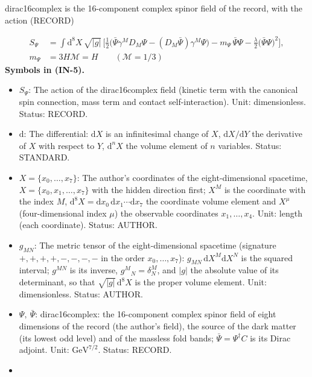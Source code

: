 \documentclass[
  10pt,
]{article}
\providecommand{\tightlist}{%
  \setlength{\itemsep}{0pt}\setlength{\parskip}{0pt}}
\begin{document}
dirac16complex is the 16-component complex spinor field of the record,
with the action (RECORD)

\[
\begin{aligned}
S_\Psi &= \int\mathrm{d}^8X\,\sqrt{\lvert g\rvert}\,\Big[\tfrac12\big(\bar\Psi\gamma^MD_M\Psi
 - (D_M\bar\Psi)\gamma^M\Psi\big) - m_\Psi\,\bar\Psi\Psi - \frac{\lambda}{2}\big(\bar\Psi\Psi\big)^2\Big],\\
m_\Psi &= 3H\mathcal{M} = H\qquad (\mathcal{M} = 1/3)
\end{aligned} \tag{IN-5}
\] \textbf{Symbols in (IN-5).}

\begin{itemize}
\tightlist
\item
  \(S_\Psi\): The action of the dirac16complex field (kinetic term with
  the canonical spin connection, mass term and contact
  self-interaction). Unit: dimensionless. Status: RECORD.
\item
  \(\mathrm{d}\): The differential: \(\mathrm{d}X\) is an infinitesimal
  change of \(X\), \(\mathrm{d}X/\mathrm{d}Y\) the derivative of \(X\)
  with respect to \(Y\), \(\mathrm{d}^nX\) the volume element of \(n\)
  variables. Status: STANDARD.
\item
  \(X = \{x_0, \dots, x_7\}\): The author's coordinates of the
  eight-dimensional spacetime, \(X = \{x_0, x_1, \dots, x_7\}\) with the
  hidden direction first; \(X^M\) is the coordinate with the index
  \(M\),
  \(\mathrm{d}^8X = \mathrm{d}x_0\,\mathrm{d}x_1\cdots\mathrm{d}x_7\)
  the coordinate volume element and \(X^\mu\) (four-dimensional index
  \(\mu\)) the observable coordinates \(x_1, \dots, x_4\). Unit: length
  (each coordinate). Status: AUTHOR.
\item
  \(g_{MN}\): The metric tensor of the eight-dimensional spacetime
  (signature \(+,+,+,+,-,-,-,-\) in the order \(x_0, \dots, x_7\)):
  \(g_{MN}\,\mathrm{d}X^M\mathrm{d}X^N\) is the squared interval;
  \(g^{MN}\) is its inverse, \(g^M{}_N = \delta^M_N\), and
  \(\lvert g\rvert\) the absolute value of its determinant, so that
  \(\sqrt{\lvert g\rvert}\,\mathrm{d}^8X\) is the proper volume element.
  Unit: dimensionless. Status: AUTHOR.
\item
  \(\Psi,\ \bar\Psi\): dirac16complex: the 16-component complex spinor
  field of eight dimensions of the record (the author's field), the
  source of the dark matter (its lowest odd level) and of the massless
  fold bands; \(\bar\Psi = \Psi^\dagger C\) is its Dirac adjoint. Unit:
  \(\mathrm{GeV}^{7/2}\). Status: RECORD.
\item

\end{itemize}
\end{document}
